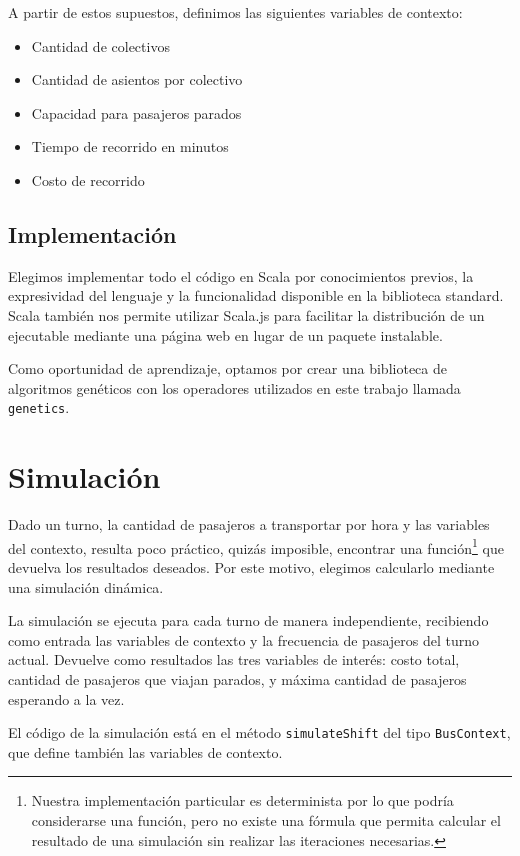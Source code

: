 \documentclass[a4paper,12pt]{article}
\begin{document}
A partir de estos supuestos, definimos las siguientes variables de contexto:

\begin{itemize}
	\item Cantidad de colectivos
	\item Cantidad de asientos por colectivo
	\item Capacidad para pasajeros parados
	\item Tiempo de recorrido en minutos
	\item Costo de recorrido
\end{itemize}

\subsection{Implementación}

Elegimos implementar todo el código en Scala por conocimientos previos, la expresividad del lenguaje y la funcionalidad disponible en la biblioteca standard.
Scala también nos permite utilizar Scala.js\cite{scalajs} para facilitar la distribución de un ejecutable mediante una página web en lugar de un paquete instalable.

Como oportunidad de aprendizaje, optamos por crear una biblioteca de algoritmos genéticos con los operadores utilizados en este trabajo llamada \texttt{genetics}\cite{genetics}.

\section{Simulación}

Dado un turno, la cantidad de pasajeros a transportar por hora y las variables del contexto, resulta poco práctico, quizás imposible, encontrar una función\footnote{Nuestra implementación particular es determinista por lo que podría considerarse una función, pero no existe una fórmula que permita calcular el resultado de una simulación sin realizar las iteraciones necesarias.} que devuelva los resultados deseados.
Por este motivo, elegimos calcularlo mediante una simulación dinámica.

La simulación se ejecuta para cada turno de manera independiente, recibiendo como entrada las variables de contexto y la frecuencia de pasajeros del turno actual.
Devuelve como resultados las tres variables de interés: costo total, cantidad de pasajeros que viajan parados, y máxima cantidad de pasajeros esperando a la vez.

El código de la simulación está en el método \texttt{simulateShift} del tipo \texttt{BusContext}, que define también las variables de contexto.
\end{document}
